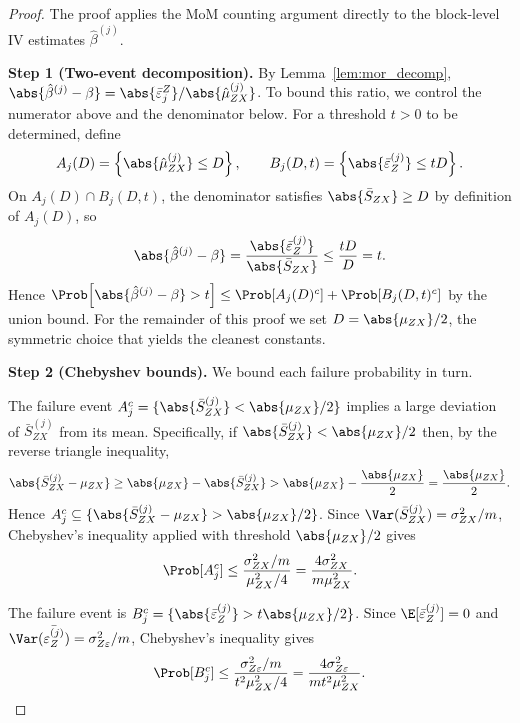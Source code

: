 \begin{proof}
The proof applies the MoM counting argument directly to the block-level IV estimates $\hat{\beta}^{(j)}$.

\medskip\noindent\textbf{Step 1 (Two-event decomposition).} By Lemma~\ref{lem:mor_decomp}, $\abs{\hat{\beta}^{(j)} - \beta} = \abs{\bar{\varepsilon}_j^Z}/\abs{\hat{\mu}_{ZX}^{(j)}}$. To bound this ratio, we control the numerator above and the denominator below. For a threshold $t > 0$ to be determined, define
\[
    A_j(D) = \left\{\abs{\hat{\mu}_{ZX}^{(j)}} \leq D\right\}, \qquad B_j(D,t) = \left\{\abs{\bar{\varepsilon}_Z^{(j)}} \leq tD\right\}.
\]
On $A_j(D)\cap B_j(D,t)$, the denominator satisfies $\abs{\bar{S}_{ZX}}\geq D$ by definition of $A_j(D)$, so
\[
    \abs{\hat{\beta}^{(j)} - \beta} = \frac{\abs{\bar{\varepsilon}_Z^{(j)}}}{\abs{\bar{S}_{ZX}}} \leq \frac{tD}{D} = t.
\]
Hence $\Prob\!\left[\abs{\hat\beta^{(j)}-\beta}>t\right] \leq \Prob[A_j(D)^c] + \Prob[B_j(D,t)^c]$ by the union bound. For the remainder of this proof we set $D = \abs{\mu_{ZX}}/2$, the symmetric choice that yields the cleanest constants.

    \medskip\noindent\textbf{Step 2 (Chebyshev bounds).}
    We bound each failure probability in turn.

    The failure event $A_j^c = \{\abs{\bar{S}_{ZX}^{(j)}} < \abs{\mu_{ZX}}/2\}$ implies a large deviation of $\bar{S}_{ZX}^{(j)}$ from its mean. Specifically, if $\abs{\bar{S}_{ZX}^{(j)}} < \abs{\mu_{ZX}}/2$ then, by the reverse triangle inequality,
    \[
        \abs{\bar{S}_{ZX}^{(j)} - \mu_{ZX}} \geq \abs{\mu_{ZX}} - \abs{\bar{S}_{ZX}^{(j)}} > \abs{\mu_{ZX}} - \frac{\abs{\mu_{ZX}}}{2} = \frac{\abs{\mu_{ZX}}}{2}.
    \]
    Hence $A_j^c \subseteq \{\abs{\bar{S}_{ZX}^{(j)}-\mu_{ZX}} > \abs{\mu_{ZX}}/2\}$. Since $\Var(\bar{S}_{ZX}^{(j)}) = \sigma_{ZX}^2/m$, Chebyshev's inequality applied with threshold $\abs{\mu_{ZX}}/2$ gives
    \[
        \Prob[A_j^c] \leq \frac{\sigma_{ZX}^2/m}{\mu_{ZX}^2/4} = \frac{4\sigma_{ZX}^2}{m\mu_{ZX}^2}.
    \]

    The failure event is $B_j^c = \{\abs{\bar{\varepsilon}_Z^{(j)}} > t\abs{\mu_{ZX}}/2\}$. Since $\E[\bar{\varepsilon}_Z^{(j)}] = 0$ and $\Var(\bar{\varepsilon_Z^{(j)}}) = \sigma_{Z\varepsilon}^2/m$, Chebyshev's inequality gives
    \[
        \Prob[B_j^c] \leq \frac{\sigma_{Z\varepsilon}^2/m}{t^2\mu_{ZX}^2/4} = \frac{4\sigma_{Z\varepsilon}^2}{mt^2\mu_{ZX}^2}.
    \]


\end{proof}
